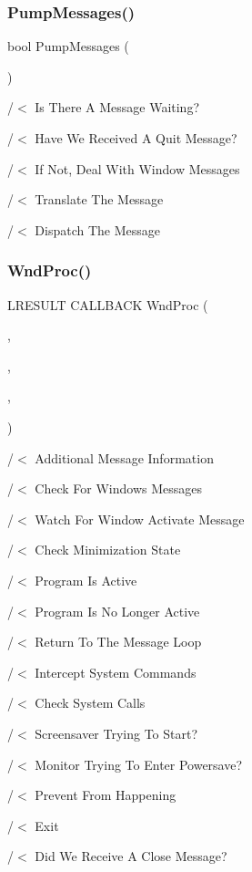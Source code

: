 \subsubsection{Pump\+Messages()}
{\footnotesize\ttfamily bool Pump\+Messages (\begin{DoxyParamCaption}{ }\end{DoxyParamCaption})}

/$<$ Is There A Message Waiting?

/$<$ Have We Received A Quit Message?

/$<$ If Not, Deal With Window Messages

/$<$ Translate The Message

/$<$ Dispatch The Message \mbox{\label{supportcode_8h_a9135ea2a0d6fce68ba3b858226a31a4f}} 
\subsubsection{Wnd\+Proc()}
{\footnotesize\ttfamily L\+R\+E\+S\+U\+LT C\+A\+L\+L\+B\+A\+CK Wnd\+Proc (\begin{DoxyParamCaption}\item[{H\+W\+ND}]{,  }\item[{U\+I\+NT}]{,  }\item[{W\+P\+A\+R\+AM}]{,  }\item[{L\+P\+A\+R\+AM}]{ }\end{DoxyParamCaption})}



/$<$ Additional Message Information 

/$<$ Check For Windows Messages

/$<$ Watch For Window Activate Message

/$<$ Check Minimization State

/$<$ Program Is Active

/$<$ Program Is No Longer Active

/$<$ Return To The Message Loop

/$<$ Intercept System Commands

/$<$ Check System Calls

/$<$ Screensaver Trying To Start?

/$<$ Monitor Trying To Enter Powersave?

/$<$ Prevent From Happening

/$<$ Exit

/$<$ Did We Receive A Close Message?

